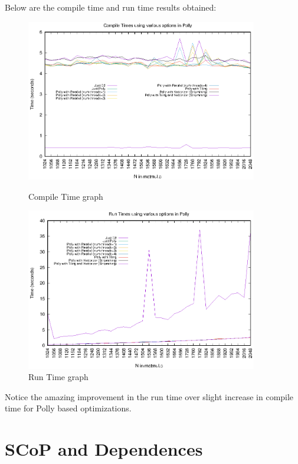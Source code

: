 \documentclass{article}
\begin{document}
\begin{flushleft}
Below are the compile time and run time results obtained:
\begin{figure}[H]
\begin{minipage}{0.45\linewidth}
\includegraphics[width=0.9\textwidth]{./images/compile_time.eps}
\caption{Compile Time graph}
\end{minipage}
\hfill
\begin{minipage}{0.45\linewidth}
\includegraphics[width=0.9\textwidth]{./images/run_time.eps}
\caption{Run Time graph}
\end{minipage}
\end{figure}

Notice the amazing improvement in the run time over slight increase in compile time for Polly based optimizations.
\end{flushleft}

\section{SCoP and Dependences}
\end{document}
